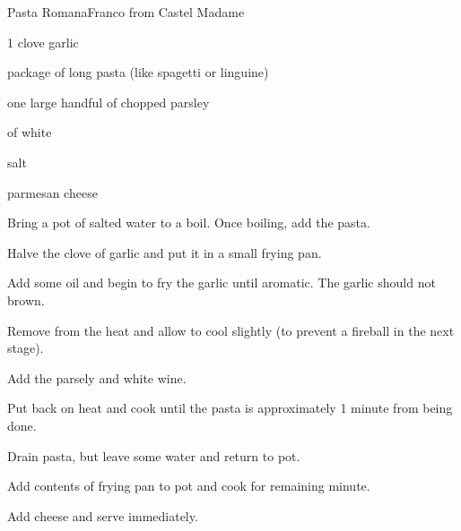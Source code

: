 \begin{recipe}{Pasta Romana}{Franco from Castel Madame}{}

\begin{ingredients}
\item 1 clove garlic
\item \half package of long pasta (like spagetti or linguine)
\item one large handful of chopped parsley
\item \C{\half} of white 
\item {}
\item salt
\item parmesan cheese
\end{ingredients}

\begin{directions}
\item Bring a pot of salted water to a boil. Once boiling, add the pasta.
\item Halve the clove of garlic and put it in a small frying pan.
\item Add some oil and begin to fry the garlic until aromatic. The garlic should not brown.
\item Remove from the heat and allow to cool slightly (to prevent a fireball in the next stage).
\item Add the parsely and white wine.
\item Put back on heat and cook until the pasta is approximately 1 minute from being done.
\item Drain pasta, but leave some water and return to pot.
\item Add contents of frying pan to pot and cook for remaining minute.
\item Add cheese and serve immediately.
\end{directions}

\end{recipe}
